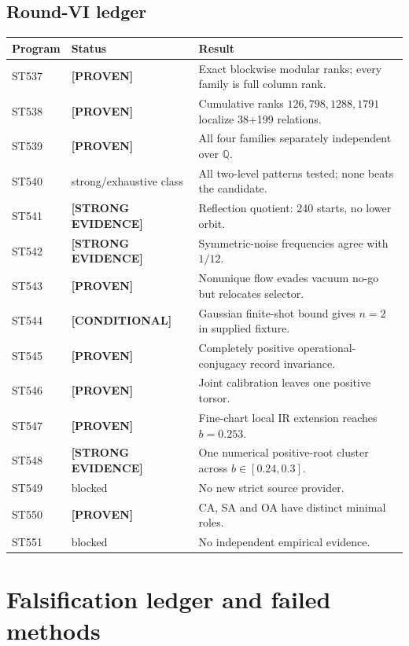 \documentclass[11pt,a4paper]{article}
\theoremstyle{definition}\newtheorem{definition}[theorem]{Definition}
\theoremstyle{remark}\newtheorem{remark}[theorem]{Remark}
\newcommand{\status}[2]{\textcolor{#1}{\textbf{[#2]}}}
\newcommand{\proven}{\status{fingreen}{PROVEN}}\newcommand{\strong}{\status{finblue}{STRONG EVIDENCE}}
\newcommand{\conditional}{\status{fingray}{CONDITIONAL}}\newcommand{\open}{\status{finorange}{OPEN}}
\begin{document}
\subsection{Round-VI ledger}
\begin{longtable}{@{}p{}p{}p{}@{}}\toprule Program&Status&Result\\\midrule\endhead
ST537&\proven&Exact blockwise modular ranks; every family is full column rank.\\
ST538&\proven&Cumulative ranks $126,798,1288,1791$ localize 38+199 relations.\\
ST539&\proven&All four families separately independent over $\mathbb Q$.\\
ST540&strong/exhaustive class&All two-level patterns tested; none beats the candidate.\\
ST541&\strong&Reflection quotient: 240 starts, no lower orbit.\\
ST542&\strong&Symmetric-noise frequencies agree with $1/12$.\\
ST543&\proven&Nonunique flow evades vacuum no-go but relocates selector.\\
ST544&\conditional&Gaussian finite-shot bound gives $n=2$ in supplied fixture.\\
ST545&\proven&Completely positive operational-conjugacy record invariance.\\
ST546&\proven&Joint calibration leaves one positive torsor.\\
ST547&\proven&Fine-chart local IR extension reaches $b=0.253$.\\
ST548&\strong&One numerical positive-root cluster across $b\in[0.24,0.3]$.\\
ST549&blocked&No new strict source provider.\\
ST550&\proven&CA, SA and OA have distinct minimal roles.\\
ST551&blocked&No independent empirical evidence.\\\bottomrule\end{longtable}

\section{Falsification ledger and failed methods}
\end{document}
